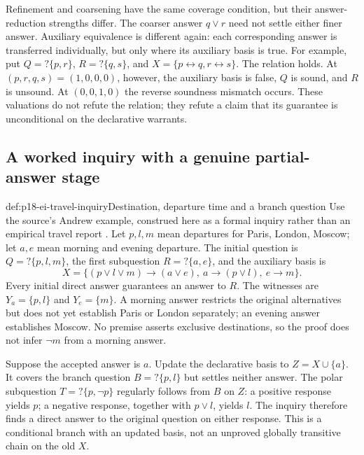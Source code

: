 Refinement and coarsening have the same coverage condition, but their
answer-reduction strengths differ. The coarser answer \(q\lor r\) need
not settle either finer answer. Auxiliary equivalence is different again:
each corresponding answer is transferred individually, but only where its
auxiliary basis is true. For example, put
\(Q=?\{p,r\}\), \(R=?\{q,s\}\), and
\(X=\{p\leftrightarrow q,r\leftrightarrow s\}\).
The relation holds. At \((p,r,q,s)=(1,0,0,0)\), however, the auxiliary
basis is false, \(Q\) is sound, and \(R\) is unsound. At
\((0,0,1,0)\) the reverse soundness mismatch occurs. These valuations
do not refute the relation; they refute a claim that its guarantee is
unconditional on the declarative warrants.

\subsection{A worked inquiry with a genuine partial-answer stage}

\begin{hbexample}{def:p18-ei-travel-inquiry}{Destination, departure time and a branch question}
Use the source's Andrew example, construed here as a formal inquiry rather
than an empirical travel report \cite[p.~25]{Wisniewski2001QuestionsInferences}.
Let \(p,l,m\) mean departures for Paris, London, Moscow; let \(a,e\)
mean morning and evening departure. The initial question is
\(Q=?\{p,l,m\}\), the first subquestion \(R=?\{a,e\}\), and the
auxiliary basis is
\[
 X=\{(p\lor l\lor m)\to(a\lor e),\ a\to(p\lor l),\ e\to m\}.
\]
Every initial direct answer guarantees an answer to \(R\).
The witnesses are \(Y_a=\{p,l\}\) and \(Y_e=\{m\}\).
A morning answer restricts the original alternatives but does not yet
establish Paris or London separately; an evening answer establishes Moscow.
No premise asserts exclusive destinations, so the proof does not infer
\(\neg m\) from a morning answer.

Suppose the accepted answer is \(a\). Update the declarative basis to
\(Z=X\cup\{a\}\). It covers the branch question \(B=?\{p,l\}\)
but settles neither answer. The polar subquestion \(T=?\{p,\neg p\}\)
regularly follows from \(B\) on \(Z\): a positive response yields \(p\);
a negative response, together with \(p\lor l\), yields \(l\).
The inquiry therefore finds a direct answer to the original question on
either response. This is a conditional branch with an updated basis, not
an unproved globally transitive chain on the old \(X\).
\end{hbexample}

